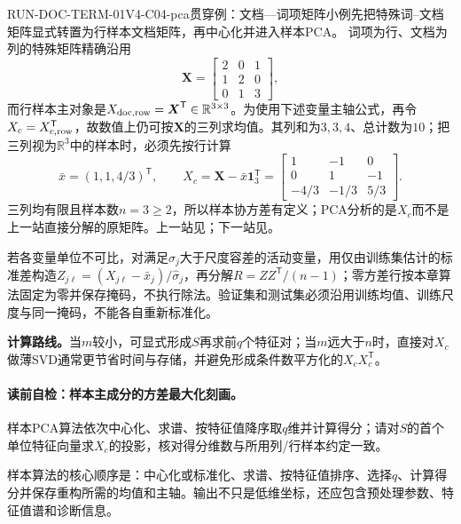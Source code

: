 \begin{SLRunningExample}{RUN-DOC-TERM-01}{V4-C04-pca}{贯穿例：文档—词项矩阵小例}{先把特殊词--文档矩阵显式转置为行样本文档矩阵，再中心化并进入样本PCA。}
词项为行、文档为列的特殊矩阵精确沿用
\[
\boldsymbol X=\begin{bmatrix}2&0&1\\1&2&0\\0&1&3\end{bmatrix},
\]
而行样本主对象是$X_{{\rm doc},{\rm row}}=\boldsymbol X^{\mathsf T}\in\mathbb R^{3\times3}$。为使用下述变量主轴公式，再令$X_c=X_{c,{\rm row}}^{\mathsf T}$，故数值上仍可按$\boldsymbol X$的三列求均值。其列和为$3,3,4$、总计数为$10$；把三列视为$\mathbb R^3$中的样本时，必须先按行计算
\[
\bar x=(1,1,4/3)^{\mathsf T},\qquad
X_c=\boldsymbol X-\bar x\boldsymbol1_3^{\mathsf T}
=\begin{bmatrix}1&-1&0\\0&1&-1\\-4/3&-1/3&5/3\end{bmatrix}.
\]
三列均有限且样本数$n=3\geq2$，所以样本协方差有定义；PCA分析的是$X_c$而不是上一站直接分解的原矩阵。上一站见；下一站见。
\end{SLRunningExample}

若各变量单位不可比，对满足$\widehat\sigma_j$大于尺度容差的活动变量，用仅由训练集估计的标准差构造$Z_{j\ell}=(X_{j\ell}-\bar x_j)/\widehat\sigma_j$，再分解$R=ZZ^{\mathsf T}/(n-1)$；零方差行按本章算法固定为零并保存掩码，不执行除法。验证集和测试集必须沿用训练均值、训练尺度与同一掩码，不能各自重新标准化。

\label{struct:V4-C04-CH10}
\textbf{计算路线。}当$m$较小，可显式形成$S$再求前$q$个特征对；当$m$远大于$n$时，直接对$X_c$做薄SVD通常更节省时间与存储，并避免形成条件数平方化的$X_cX_c^{\mathsf T}$。

\paragraph{读前自检：样本主成分的方差最大化刻画。}样本PCA算法依次中心化、求谱、按特征值降序取$q$维并计算得分；请对$S$的首个单位特征向量求$X_c$的投影，核对得分维数与所用列/行样本约定一致。\par

样本算法的核心顺序是：中心化或标准化、求谱、按特征值排序、选择$q$、计算得分并保存重构所需的均值和主轴。输出不只是低维坐标，还应包含预处理参数、特征值谱和诊断信息。

